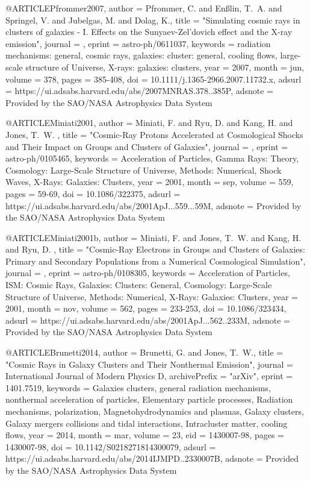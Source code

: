 \documentclass[useAMS,usenatbib]{mnras}
\begin{document}
{{{{{{@ARTICLE{Pfrommer2007,
   author = {{Pfrommer}, C. and {En{\ss}lin}, T.~A. and {Springel}, V. and 
	{Jubelgas}, M. and {Dolag}, K.},
    title = "{Simulating cosmic rays in clusters of galaxies - I. Effects on the Sunyaev-Zel'dovich effect and the X-ray emission}",
  journal = {\mnras},
   eprint = {astro-ph/0611037},
 keywords = {radiation mechanisms: general, cosmic rays, galaxies: cluster: general, cooling flows, large-scale structure of Universe, X-rays: galaxies: clusters},
     year = 2007,
    month = jun,
   volume = 378,
    pages = {385-408},
      doi = {10.1111/j.1365-2966.2007.11732.x},
   adsurl = {https://ui.adsabs.harvard.edu/abs/2007MNRAS.378..385P},
  adsnote = {Provided by the SAO/NASA Astrophysics Data System}
}

@ARTICLE{Miniati2001,
   author = {{Miniati}, F. and {Ryu}, D. and {Kang}, H. and {Jones}, T.~W.
	},
    title = "{Cosmic-Ray Protons Accelerated at Cosmological Shocks and Their Impact on Groups and Clusters of Galaxies}",
  journal = {\apj},
   eprint = {astro-ph/0105465},
 keywords = {Acceleration of Particles, Gamma Rays: Theory, Cosmology: Large-Scale Structure of Universe, Methods: Numerical, Shock Waves, X-Rays: Galaxies: Clusters},
     year = 2001,
    month = sep,
   volume = 559,
    pages = {59-69},
      doi = {10.1086/322375},
   adsurl = {https://ui.adsabs.harvard.edu/abs/2001ApJ...559...59M},
  adsnote = {Provided by the SAO/NASA Astrophysics Data System}
}

@ARTICLE{Miniati2001b,
   author = {{Miniati}, F. and {Jones}, T.~W. and {Kang}, H. and {Ryu}, D.
	},
    title = "{Cosmic-Ray Electrons in Groups and Clusters of Galaxies: Primary and Secondary Populations from a Numerical Cosmological Simulation}",
  journal = {\apj},
   eprint = {astro-ph/0108305},
 keywords = {Acceleration of Particles, ISM: Cosmic Rays, Galaxies: Clusters: General, Cosmology: Large-Scale Structure of Universe, Methods: Numerical, X-Rays: Galaxies: Clusters},
     year = 2001,
    month = nov,
   volume = 562,
    pages = {233-253},
      doi = {10.1086/323434},
   adsurl = {https://ui.adsabs.harvard.edu/abs/2001ApJ...562..233M},
  adsnote = {Provided by the SAO/NASA Astrophysics Data System}
}

@ARTICLE{Brunetti2014,
   author = {{Brunetti}, G. and {Jones}, T.~W.},
    title = "{Cosmic Rays in Galaxy Clusters and Their Nonthermal Emission}",
  journal = {International Journal of Modern Physics D},
archivePrefix = "arXiv",
   eprint = {1401.7519},
 keywords = {Galaxies clusters, general radiation mechanisms, nonthermal acceleration of particles, Elementary particle processes, Radiation mechanisms, polarization, Magnetohydrodynamics and plasmas, Galaxy clusters, Galaxy mergers collisions and tidal interactions, Intracluster matter, cooling flows},
     year = 2014,
    month = mar,
   volume = 23,
      eid = {1430007-98},
    pages = {1430007-98},
      doi = {10.1142/S0218271814300079},
   adsurl = {https://ui.adsabs.harvard.edu/abs/2014IJMPD..2330007B},
  adsnote = {Provided by the SAO/NASA Astrophysics Data System}
}

}}}}}}
\end{document}
